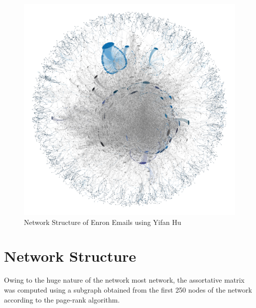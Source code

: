 \documentclass[11pt, oneside]{article}   	%
\begin{document}
	\begin{figure}
  \centering
  \includegraphics[width=\columnwidth]{na-ee-graph-final.png}
  \caption{Network Structure of Enron Emails using Yifan Hu }
\end{figure}

\pagebreak

\section{Network Structure}
Owing to the huge nature of the network most network, the assortative matrix was computed using a subgraph obtained from the first 250 nodes of the network according to the page-rank algorithm.

\pagebreak
\end{document}
